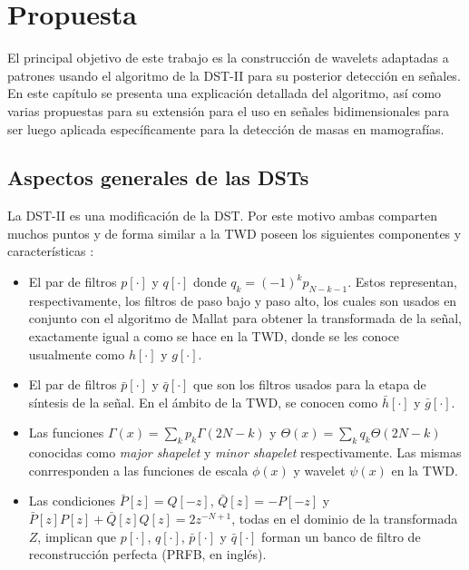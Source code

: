 \chapter{Propuesta}\label{chapter:proposal}

El principal objetivo de este trabajo es la construcción de wavelets adaptadas a patrones usando el algoritmo de
la DST-II \cite{Guido2018} para su posterior detección en señales. En este capítulo se presenta una explicación 
detallada del algoritmo, así como varias propuestas para su extensión para el uso en señales bidimensionales para
ser luego aplicada específicamente para la detección de masas en mamografías.

\section{Aspectos generales de las DSTs}

La DST-II es una modificación de la DST. Por este motivo ambas comparten muchos puntos y de forma similar 
a la TWD poseen los siguientes componentes y características \cite{Guido2008}\cite{Guido2018}:

\begin{itemize}
	\item El par de filtros $p[\cdot]$ y $q[\cdot]$ donde $q_k = (-1)^k p_{N-k-1}$. 
		Estos representan, respectivamente, los filtros de paso bajo y paso alto, los cuales son  
		usados en conjunto con el algoritmo de Mallat para obtener la transformada de la 
		señal, exactamente igual a como se hace en la TWD, donde se les conoce usualmente como $h[\cdot]$ y
		$g[\cdot]$.
	\item El par de filtros $\bar p[\cdot]$  y $\bar q[\cdot]$ que son los filtros usados para la etapa 
		de síntesis de la señal. En el ámbito de la TWD, se conocen como $\bar h[\cdot]$ y $\bar g[\cdot]$.
	\item Las funciones $\displaystyle \Gamma(x)=\sum_k p_k \Gamma(2N-k)$ y $\displaystyle \Theta(x)=\sum_k q_k \Theta(2N-k)$ conocidas 
		como \textit{major shapelet} y \textit{minor shapelet} respectivamente. Las mismas conrresponden a las
		funciones de escala $\phi(x)$ y wavelet $\psi(x)$ en la TWD.
	\item Las condiciones $\bar P[z] = Q[-z]$, $\bar Q[z]=-P[-z]$ y $\bar P[z]P[z] + \bar Q[z]Q[z]=2z^{-N+1}$,
		todas en el dominio de la transformada $Z$, implican que $p[\cdot]$, $q[\cdot]$, $\bar p[\cdot]$  y $\bar q[\cdot]$
		forman un banco de filtro de reconstrucción perfecta (PRFB, en inglés).
\end{itemize}

